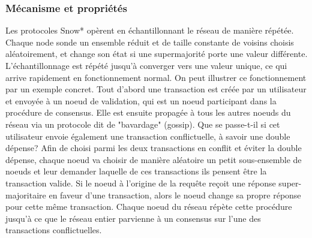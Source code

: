 \documentclass[runningheads]{llncs}
\begin{document}
\subsubsection{Mécanisme et propriétés}
Les protocoles Snow* opèrent en échantillonnant le réseau de manière répétée. Chaque node sonde un ensemble réduit et de
taille constante de voisins choisis aléatoirement, et change son état si une supermajorité porte une valeur différente.
L'échantillonnage est répété jusqu'à converger vers une valeur unique, ce qui arrive rapidement en fonctionnement
normal. On peut illustrer ce fonctionnement par un exemple concret. Tout d'abord une transaction est créée par un
utilisateur et envoyée à un noeud de validation, qui est un noeud participant dans la procédure de consensus. Elle est
ensuite propagée à tous les autres noeuds du réseau via un protocole dit de "bavardage" (gossip). Que se passe-t-il si
cet utilisateur envoie également une transaction conflictuelle, à savoir une double dépense? Afin de choisi parmi les
deux transactions en conflit et éviter la double dépense, chaque noeud va choisir de manière aléatoire un petit
sous-ensemble de noeuds et leur demander laquelle de ces transactions ils pensent être la transaction valide. Si le
noeud à l'origine de la requête reçoit une réponse super-majoritaire en faveur d'une transaction, alors le noeud change
sa propre réponse pour cette même transaction. Chaque noeud du réseau répète cette procédure jusqu'à ce que le réseau
entier parvienne à un consensus sur l'une des transactions conflictuelles.
\end{document}

